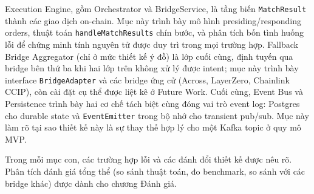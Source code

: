 Execution Engine, gồm Orchestrator và BridgeService, là tầng biến \texttt{MatchResult} thành các giao dịch on-chain. Mục này trình bày mô hình presiding/responding orders, thuật toán \texttt{handleMatchResults} chín bước, và phân tích bốn tình huống lỗi để chứng minh tính nguyên tử được duy trì trong mọi trường hợp. Fallback Bridge Aggregator (chỉ ở mức thiết kế ý đồ) là lớp cuối cùng, định tuyến qua bridge bên thứ ba khi hai lớp trên không xử lý được intent; mục này trình bày interface \texttt{BridgeAdapter} và các bridge ứng cử (Across, LayerZero, Chainlink CCIP), còn cài đặt cụ thể được liệt kê ở Future Work. Cuối cùng, Event Bus và Persistence trình bày hai cơ chế tách biệt cùng đóng vai trò event log: Postgres cho durable state và \texttt{EventEmitter} trong bộ nhớ cho transient pub/sub. Mục này làm rõ tại sao thiết kế này là sự thay thế hợp lý cho một Kafka topic ở quy mô MVP.

Trong mỗi mục con, các trường hợp lỗi và các đánh đổi thiết kế được nêu rõ. Phân tích đánh giá tổng thể (so sánh thuật toán, đo benchmark, so sánh với các bridge khác) được dành cho chương Đánh giá.









